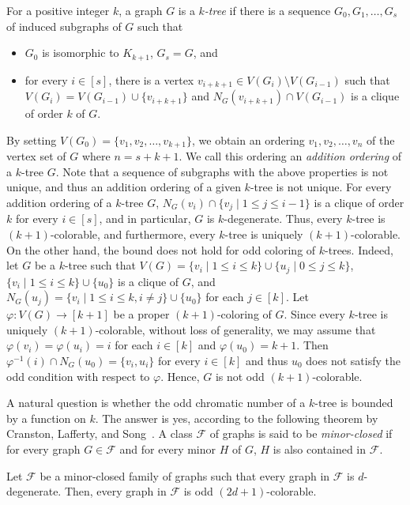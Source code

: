 For a positive integer $k$, a graph $G$ is a \emph{$k$-tree} if there is a sequence $G_0, G_1, \dots , G_s$ of induced subgraphs of $G$ such that 
\begin{itemize}
  \item $G_0$ is isomorphic to $K_{k+1}$, $G_s=G$, and
  \item for every $i\in [s]$, there is a vertex $v_{i+k+1}\in V(G_i)\setminus V(G_{i-1})$ such that $V(G_i)=V(G_{i-1})\cup \{v_{i+k+1}\}$ and $N_G(v_{i+k+1})\cap V(G_{i-1})$ is a clique of order $k$ of $G$.
\end{itemize}
By setting $V(G_0)=\{v_1,v_2,\dots , v_{k+1}\}$, we obtain an ordering $v_1,v_2,\dots , v_n$ of the vertex set of $G$ where $n=s+k+1$.
We call this ordering an \emph{addition ordering} of a $k$-tree $G$.
Note that a sequence of subgraphs with the above properties is not unique, and thus an addition ordering of a given $k$-tree is not unique.
For every addition ordering of a $k$-tree $G$, $N_G(v_i)\cap \{v_j\mid 1\leq j\leq i-1\}$ is a clique of order $k$ for every $i\in [s]$, and in particular, $G$ is $k$-degenerate.
Thus, every $k$-tree is $(k+1)$-colorable, and furthermore, every $k$-tree is uniquely $(k+1)$-colorable.
On the other hand, the bound does not hold for odd coloring of $k$-trees.
Indeed, let $G$ be a $k$-tree such that $V(G)=\{v_i\mid 1\leq i\leq k\}\cup \{u_j\mid 0\leq j\leq k\}$, $\{v_i\mid 1\leq i\leq k\}\cup \{u_0\}$ is a clique of $G$, and $N_G(u_j)=\{v_i\mid 1\leq i\leq k, i\neq j\}\cup \{u_0\}$ for each $j\in [k]$. 
Let $\varphi:V(G)\to [k+1]$ be a proper $(k+1)$-coloring of $G$.
Since every $k$-tree is uniquely $(k+1)$-colorable, without loss of generality, we may assume that $\varphi(v_i)=\varphi(u_i)=i$ for each $i\in [k]$ and $\varphi(u_0)=k+1$.
Then $\varphi^{-1}(i)\cap N_G(u_0)=\{v_i,u_i\}$ for every $i\in [k]$ and thus $u_0$ does not satisfy the odd condition with respect to $\varphi$.
Hence, $G$ is not odd $(k+1)$-colorable.

A natural question is whether the odd chromatic number of a $k$-tree is bounded by a function on $k$.
The answer is yes, according to the following theorem by Cranston, Lafferty, and Song~\cite{CLS2023}.
A class $\mathcal{F}$ of graphs is said to be \emph{minor-closed} if for every graph $G\in \mathcal{F}$ and for every minor $H$ of $G$, $H$ is also contained in $\mathcal{F}$.

\begin{theorem}\label{thm:minor closed}
  Let $\mathcal{F}$ be a minor-closed family of graphs such that every graph in $\mathcal{F}$ is $d$-degenerate.
  Then, every graph in $\mathcal{F}$ is odd $(2d+1)$-colorable.
\end{theorem}

